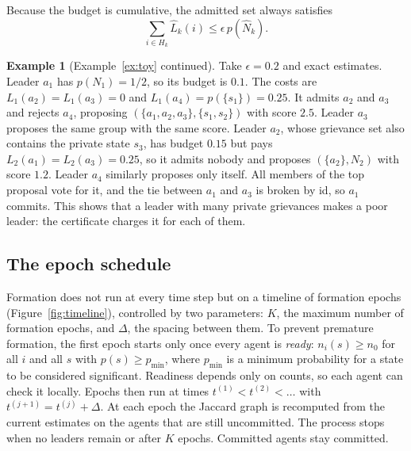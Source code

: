 \documentclass[11pt]{article}
\theoremstyle{plain}
\theoremstyle{definition}
\newtheorem{example}[theorem]{Example}
\theoremstyle{remark}
\begin{document}
Because the budget is cumulative, the admitted set always satisfies
\begin{equation}\label{eq:budget}
\sum_{i \in H_k}\hat{L}_k(i) \leq \epsilon\, p(\hat{N}_k).
\end{equation}
 
\begin{example}[Example~\ref{ex:toy} continued]
Take $\epsilon = 0.2$ and exact estimates. Leader $a_1$ has $p(N_1)=1/2$, so its budget is $0.1$. The costs are $L_1(a_2)=L_1(a_3)=0$ and $L_1(a_4)=p(\{s_1\})=0.25$.
It admits $a_2$ and $a_3$ and rejects $a_4$, proposing $(\{a_1,a_2,a_3\},\{s_1,s_2\})$ with score $2.5$. Leader $a_3$ proposes the same group with the same score.
Leader $a_2$, whose grievance set also contains the private state $s_3$, has budget $0.15$ but pays $L_2(a_1)=L_2(a_3)=0.25$, so it admits nobody and proposes $(\{a_2\},N_2)$ with score $1.2$.
Leader $a_4$ similarly proposes only itself. All members of the top proposal vote for it, and the tie between $a_1$ and $a_3$ is broken by id, so $a_1$ commits.
This shows that a leader with many private grievances makes a poor leader: the certificate charges it for each of them.
\end{example}
 
\subsection{The epoch schedule}
Formation does not run at every time step but on a timeline of formation epochs (Figure~\ref{fig:timeline}), controlled by two parameters: $K$, the maximum number of formation epochs, and $\Delta$, the spacing between them.
To prevent premature formation, the first epoch starts only once every agent is \emph{ready}: $n_i(s)\ge n_0$ for all $i$ and all $s$ with $p(s)\ge p_{\min}$,
where $p_{\min}$ is a minimum probability for a state to be considered significant. Readiness depends only on counts, so each agent can check it locally.
Epochs then run at times $t^{(1)}<t^{(2)}<\dots$ with $t^{(j+1)}=t^{(j)}+\Delta$. At each epoch the Jaccard graph is recomputed from the current estimates on the agents that are still uncommitted.
The process stops when no leaders remain or after $K$ epochs. Committed agents stay committed.
 
\end{document}
